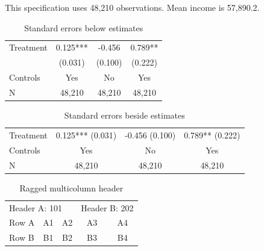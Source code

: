 \documentclass{article}
\begin{document}
This specification uses 48,210 observations.
Mean income is 57,890.2.

\begin{table}
\caption{Standard errors below estimates}
\label{tab:se_below}
\begin{tabular}{lccc}
Treatment & 0.125*** & -0.456 & 0.789** \\
          & (0.031) & (0.100) & (0.222) \\
Controls  & Yes & No & Yes \\
N         & 48,210 & 48,210 & 48,210 \\
\end{tabular}
\end{table}

\begin{table}
\caption{Standard errors beside estimates}
\label{tab:inline_se}
\begin{tabular}{lccc}
Treatment & 0.125*** (0.031) & -0.456 (0.100) & 0.789** (0.222) \\
Controls  & Yes & No & Yes \\
N         & 48,210 & 48,210 & 48,210 \\
\end{tabular}
\end{table}

\begin{table}
\caption{Ragged multicolumn header}
\label{tab:ragged}
\begin{tabular}{lcccc}
\multicolumn{3}{l}{Header A: 101} & \multicolumn{2}{r}{Header B: 202} \\
Row A & A1 & A2 & A3 & A4 \\
Row B & B1 & B2 & B3 & B4 \\
\end{tabular}
\end{table}
\end{document}
